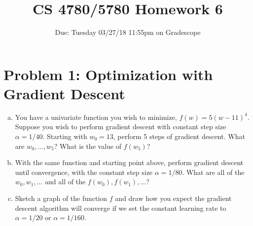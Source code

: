 \documentclass{article}
\title{CS 4780/5780 Homework 6\vspace{-10pt}}
\author{Due: Tuesday 03/27/18 11:55pm on Gradescope}
\date{}
\begin{document}
\maketitle

%
%
%
%

\section*{Problem 1: Optimization with Gradient Descent}
\begin{enumerate}[(a)]
	\item You have a univariate function you wish to minimize, $f(w)=5(w-11)^4$. Suppose you wish to perform gradient descent with constant step size $\alpha=1/40$. Starting with $w_0=13$, perform 5 steps of gradient descent. What are $w_0,...,w_5$? What is the value of $f(w_5)$?
	\item With the same function and starting point above, perform gradient descent until convergence, with the constant step size $\alpha=1/80$. What are all of the $w_0,w_1,...$ and all of the $f(w_0),f(w_1),...$?
	\item Sketch a graph of the function $f$ and draw how you expect the gradient descent algorithm will converge if we set the constant learning rate to $\alpha=1/20$ or $\alpha=1/160$.
\end{enumerate}
\end{document}
